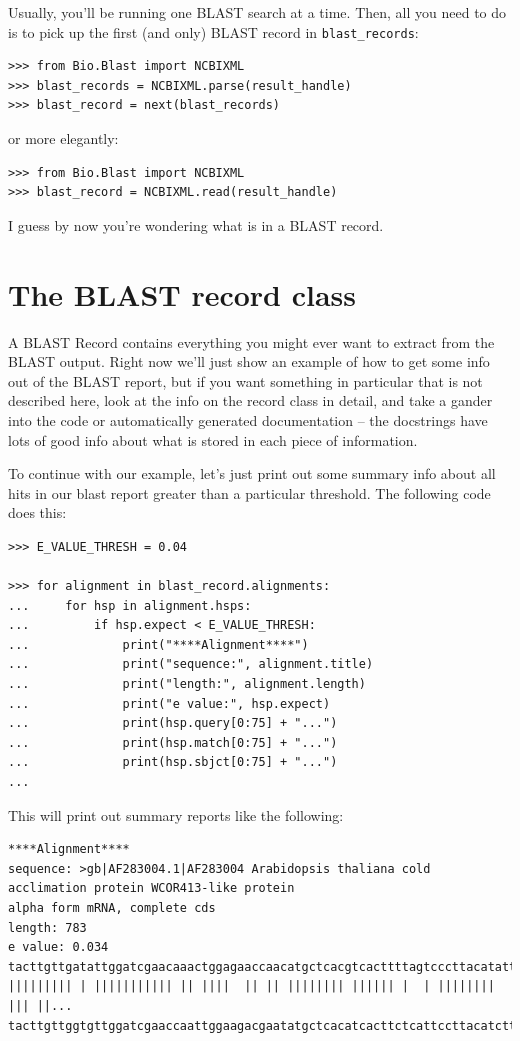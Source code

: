 Usually, you'll be running one BLAST search at a time. Then, all you need
to do is to pick up the first (and only) BLAST record in \verb|blast_records|:
\begin{verbatim}
>>> from Bio.Blast import NCBIXML
>>> blast_records = NCBIXML.parse(result_handle)
>>> blast_record = next(blast_records)
\end{verbatim}
\noindent or more elegantly:
\begin{verbatim}
>>> from Bio.Blast import NCBIXML
>>> blast_record = NCBIXML.read(result_handle)
\end{verbatim}

I guess by now you're wondering what is in a BLAST record.

\section{The BLAST record class}

A BLAST Record contains everything you might ever want to extract from the
BLAST output. Right now we'll just show
an example of how to get some info out of the BLAST report, but if you
want something in particular that is not described here, look at the
info on the record class in detail, and take a gander into the code or
automatically generated documentation -- the docstrings have lots of
good info about what is stored in each piece of information.

To continue with our example, let's just print out some summary info
about all hits in our blast report greater than a particular
threshold. The following code does this:

\begin{verbatim}
>>> E_VALUE_THRESH = 0.04

>>> for alignment in blast_record.alignments:
...     for hsp in alignment.hsps:
...         if hsp.expect < E_VALUE_THRESH:
...             print("****Alignment****")
...             print("sequence:", alignment.title)
...             print("length:", alignment.length)
...             print("e value:", hsp.expect)
...             print(hsp.query[0:75] + "...")
...             print(hsp.match[0:75] + "...")
...             print(hsp.sbjct[0:75] + "...")
...
\end{verbatim}

This will print out summary reports like the following:

\begin{verbatim}
****Alignment****
sequence: >gb|AF283004.1|AF283004 Arabidopsis thaliana cold acclimation protein WCOR413-like protein
alpha form mRNA, complete cds
length: 783
e value: 0.034
tacttgttgatattggatcgaacaaactggagaaccaacatgctcacgtcacttttagtcccttacatattcctc...
||||||||| | ||||||||||| || ||||  || || |||||||| |||||| |  | |||||||| ||| ||...
tacttgttggtgttggatcgaaccaattggaagacgaatatgctcacatcacttctcattccttacatcttcttc...
\end{verbatim}

